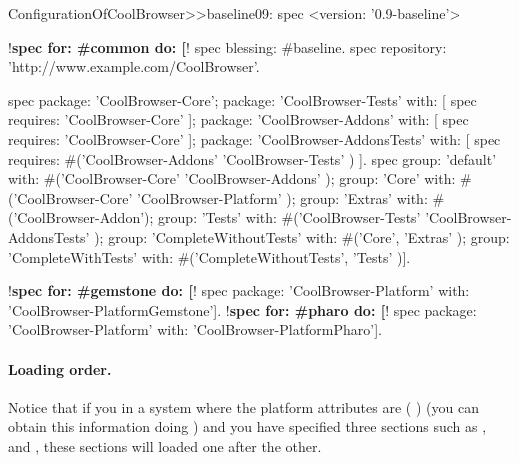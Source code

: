 \documentclass[a4paper,10pt,twoside]{book}
\begin{document}
\begin{code}{}
ConfigurationOfCoolBrowser>>baseline09: spec 
      <version: '0.9-baseline'>
      
      !\textbf{spec for: \#common do: [}!
            spec blessing: #baseline.
            spec repository: 'http://www.example.com/CoolBrowser'.
            
            spec 
                  package: 'CoolBrowser-Core';
                  package: 'CoolBrowser-Tests' with: [ spec requires: 'CoolBrowser-Core' ];
                  package: 'CoolBrowser-Addons' with: [ spec requires: 'CoolBrowser-Core' ];
                  package: 'CoolBrowser-AddonsTests' with: [ 
                        spec requires: #('CoolBrowser-Addons' 'CoolBrowser-Tests' ) ].
            spec 
                  group: 'default' with: #('CoolBrowser-Core' 'CoolBrowser-Addons' );
                  group: 'Core' with: #('CoolBrowser-Core' 'CoolBrowser-Platform' );
                  group: 'Extras' with: #('CoolBrowser-Addon');
                  group: 'Tests' with: #('CoolBrowser-Tests' 'CoolBrowser-AddonsTests' );
                  group: 'CompleteWithoutTests' with: #('Core', 'Extras' );
                  group: 'CompleteWithTests' with: #('CompleteWithoutTests', 'Tests' )].
                  
      !\textbf{spec for: \#gemstone do: [}!
            spec package: 'CoolBrowser-Platform' with: 'CoolBrowser-PlatformGemstone'].
      !\textbf{spec for: \#pharo do: [}!
            spec package: 'CoolBrowser-Platform' with: 'CoolBrowser-PlatformPharo'].
\end{code}



\paragraph{Loading order.}
 Notice that if you 
in a system where the platform attributes are (    ) (you can obtain this information doing ) and you have specified three sections such as ,  and , these sections will loaded one after the other.
\end{document}
